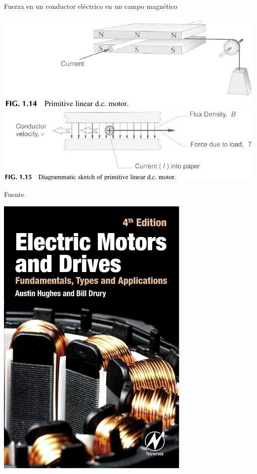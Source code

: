 \documentclass[presentation,aspectratio=169]{beamer}
\begin{document}
\begin{frame}[label={sec:orga50de8e}]{Fuerza en un conductor eléctrico en un campo magnético}
\begin{center}
\includegraphics[width=0.4\linewidth]{../../figures/HD-fig1_14.png}
\includegraphics[width=0.53\linewidth]{../../figures/HD-fig1_15.png}
\end{center}


\begin{block}{Fuente}
\begin{center}
\includegraphics[width=0.2\linewidth]{../../figures/textbook.png}
\end{center}
\end{block}
\end{frame}
\end{document}
